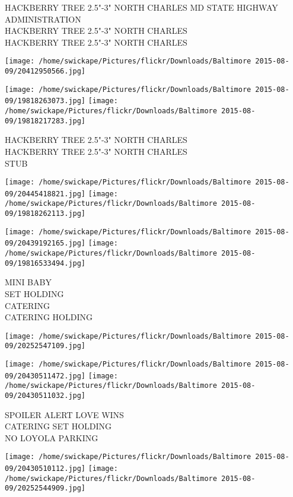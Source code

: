 \documentclass[10pt,letterpaper]{article}
\begin{document}
HACKBERRY TREE 2.5"{-}3" NORTH CHARLES MD STATE HIGHWAY ADMINISTRATION\\
HACKBERRY TREE 2.5"{-}3" NORTH CHARLES\\
HACKBERRY TREE 2.5"{-}3" NORTH CHARLES
\pagebreak

\texttt{[image: /home/swickape/Pictures/flickr/Downloads/Baltimore 2015-08-09/20412950566.jpg]}

\vspace{0.25in}
\texttt{[image: /home/swickape/Pictures/flickr/Downloads/Baltimore 2015-08-09/19818263073.jpg]}
\texttt{[image: /home/swickape/Pictures/flickr/Downloads/Baltimore 2015-08-09/19818217283.jpg]}

HACKBERRY TREE 2.5"{-}3" NORTH CHARLES\\
HACKBERRY TREE 2.5"{-}3" NORTH CHARLES\\
STUB
\pagebreak

\texttt{[image: /home/swickape/Pictures/flickr/Downloads/Baltimore 2015-08-09/20445418821.jpg]}
\texttt{[image: /home/swickape/Pictures/flickr/Downloads/Baltimore 2015-08-09/19818262113.jpg]}

\texttt{[image: /home/swickape/Pictures/flickr/Downloads/Baltimore 2015-08-09/20439192165.jpg]}
\texttt{[image: /home/swickape/Pictures/flickr/Downloads/Baltimore 2015-08-09/19816533494.jpg]}

MINI BABY\\
SET HOLDING\\
CATERING\\
CATERING HOLDING
\pagebreak

\texttt{[image: /home/swickape/Pictures/flickr/Downloads/Baltimore 2015-08-09/20252547109.jpg]}

\vspace{0.25in}
\texttt{[image: /home/swickape/Pictures/flickr/Downloads/Baltimore 2015-08-09/20430511472.jpg]}
\texttt{[image: /home/swickape/Pictures/flickr/Downloads/Baltimore 2015-08-09/20430511032.jpg]}

SPOILER ALERT LOVE WINS\\
CATERING SET HOLDING\\
NO LOYOLA PARKING
\pagebreak

\texttt{[image: /home/swickape/Pictures/flickr/Downloads/Baltimore 2015-08-09/20430510112.jpg]}
\texttt{[image: /home/swickape/Pictures/flickr/Downloads/Baltimore 2015-08-09/20252544909.jpg]}
\end{document}
